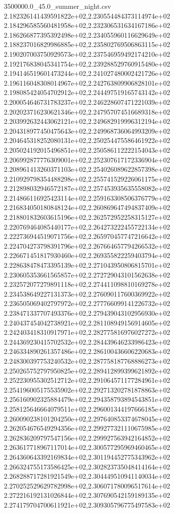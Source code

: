 \begin{filecontents*}{3500000.0_45.0_summer_night.csv}
2.182326141439591822e+02,2.230554484373114974e+02
2.184296585560481958e+02,2.232306531634167186e+02
2.186266877395392498e+02,2.234055960116629649e+02
2.188237016829986885e+02,2.235802769506863115e+02
2.190207003750929573e+02,2.237546959492174210e+02
2.192176838045341754e+02,2.239288529760915480e+02
2.194146519601473244e+02,2.241027480002421726e+02
2.196116048308014967e+02,2.242763809906828101e+02
2.198085424054702912e+02,2.244497519165743142e+02
2.200054646731783237e+02,2.246228607471221039e+02
2.202023716230621346e+02,2.247957074516689318e+02
2.203992632443062121e+02,2.249682919996312194e+02
2.204318977450475643e+02,2.249968736064993209e+02
2.204645318252080131e+02,2.250254475586461922e+02
2.205024192015496851e+02,2.250586112222154043e+02
2.206992877776309001e+02,2.252307617172336904e+02
2.208961413260371103e+02,2.254026089622857398e+02
2.210929798354488298e+02,2.255741529226061175e+02
2.212898032946572187e+02,2.257453935635558082e+02
2.214866116925423114e+02,2.259163308506376779e+02
2.216834050180848124e+02,2.260869647494837409e+02
2.218801832603615196e+02,2.262572952258315127e+02
2.220769464085440177e+02,2.264273222455722134e+02
2.222736944519071756e+02,2.265970457747216642e+02
2.224704273798391796e+02,2.267664657794266532e+02
2.226671451817930460e+02,2.269355822259403794e+02
2.228638478473395139e+02,2.271043950806815701e+02
2.230605353661565857e+02,2.272729043101562638e+02
2.232572077279891118e+02,2.274411098810169278e+02
2.234538649227131373e+02,2.276090117600369922e+02
2.236505069402797972e+02,2.277766099141226732e+02
2.238471337707493376e+02,2.279439043102956930e+02
2.240437454042738921e+02,2.281108949156914605e+02
2.242403418310917971e+02,2.282775816976027272e+02
2.244369230415702532e+02,2.284439646233986423e+02
2.246334890261357486e+02,2.286100436606220683e+02
2.248300397753240532e+02,2.287758187768886273e+02
2.250265752797950825e+02,2.289412899399621892e+02
2.252230955302512712e+02,2.291064571177284961e+02
2.254196005175535902e+02,2.292713202781878863e+02
2.256160902325884479e+02,2.294358793894543851e+02
2.258125646664079511e+02,2.296001344197666185e+02
2.260090238101204250e+02,2.297640853374678045e+02
2.262054676549294356e+02,2.299277321110675985e+02
2.262836209797547156e+02,2.299927563942164852e+02
2.263617718967117014e+02,2.300577295969460465e+02
2.264360643392169834e+02,2.301194452775343962e+02
2.266324755173586425e+02,2.302823735048414164e+02
2.268288717281921549e+02,2.304449510941140034e+02
2.270252529629782998e+02,2.306071780096517614e+02
2.272216192131026844e+02,2.307690542159189135e+02
2.274179704700611921e+02,2.309305796775497583e+02

\end{filecontents*}
